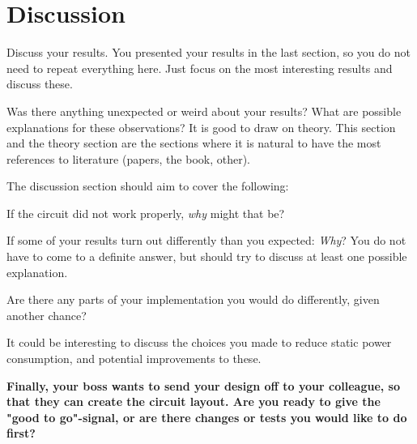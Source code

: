 \section{Discussion}
Discuss your results. You presented your results in the last section, so you do not need to repeat everything here. Just focus on the most interesting results and discuss these.

Was there anything unexpected or weird about your results? What are possible explanations for these observations? It is good to draw on theory. This section and the theory section are the sections where it is natural to have the most references to literature (papers, the book, other).

The discussion section should aim to cover the following:

\quad If the circuit did not work properly, \textit{why} might that be? 

\quad If some of your results turn out differently than you expected: \textit{Why}? You do not have to come to a definite answer, but should try to discuss at least one possible explanation.

\quad Are there any parts of your implementation you would do differently, given another chance?

\quad It could be interesting to discuss the choices you made to reduce static power consumption, and potential improvements to these.


\textbf{Finally, your boss wants to send your design off to your colleague, so that they can create the circuit layout. Are you ready to give the "good to go"-signal, or are there changes or tests you would like to do first?}